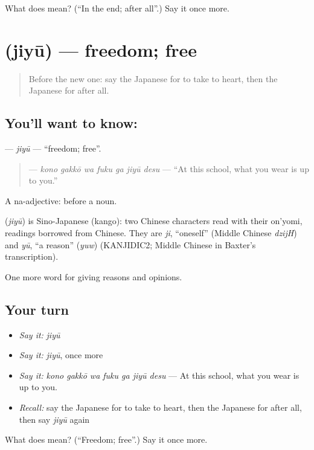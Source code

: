 \begin{tcolorbox}[breakable,colback=teal!4,colframe=teal!35!black,title={Before you move on}]
What does  mean? (\textquotedblleft{}In the end; after all\textquotedblright{}.) Say it once more.
\end{tcolorbox}
\section[\texorpdfstring{\ja{じゆう} (jiyū)}{じゆう (jiyū)}]{ (jiyū) — freedom; free}

\label{lesson:JA-C325-jiyuu}



\begin{quote}
Before the new one: say the Japanese for to take to heart, then the Japanese for after all.
\end{quote}

\subsection*{You'll want to know: }
\textbf{} — \emph{jiyū} — \textquotedblleft{}freedom; free\textquotedblright{}.

\begin{quote}
\textbf{   } — \emph{kono gakkō wa fuku ga jiyū desu} — \textquotedblleft{}At this school, what you wear is up to you.\textquotedblright{}
\end{quote}

A na-adjective:  before a noun.

\begin{cousinweb}
\textbf{} (\emph{jiyū}) is Sino-Japanese (kango): two Chinese characters read with their on'yomi, readings borrowed from Chinese. They are \emph{ji}, \textquotedblleft{}oneself\textquotedblright{} (Middle Chinese \emph{dzijH}) and \emph{yū}, \textquotedblleft{}a reason\textquotedblright{} (\emph{yuw}) (KANJIDIC2; Middle Chinese in Baxter's transcription).
\end{cousinweb}

\begin{grammarlens}[title={What you've built}]
One more word for giving reasons and opinions.
\end{grammarlens}

\subsection*{Your turn}
\begin{itemize}
\raggedright
  \item \emph{Say it:} \emph{jiyū}
  \item \emph{Say it:} \emph{jiyū}, once more
  \item \emph{Say it:} \emph{kono gakkō wa fuku ga jiyū desu} — At this school, what you wear is up to you.
  \item \emph{Recall:} say the Japanese for to take to heart, then the Japanese for after all, then say \emph{jiyū} again
\end{itemize}

\begin{tcolorbox}[breakable,colback=teal!4,colframe=teal!35!black,title={Before you move on}]
What does  mean? (\textquotedblleft{}Freedom; free\textquotedblright{}.) Say it once more.
\end{tcolorbox}
